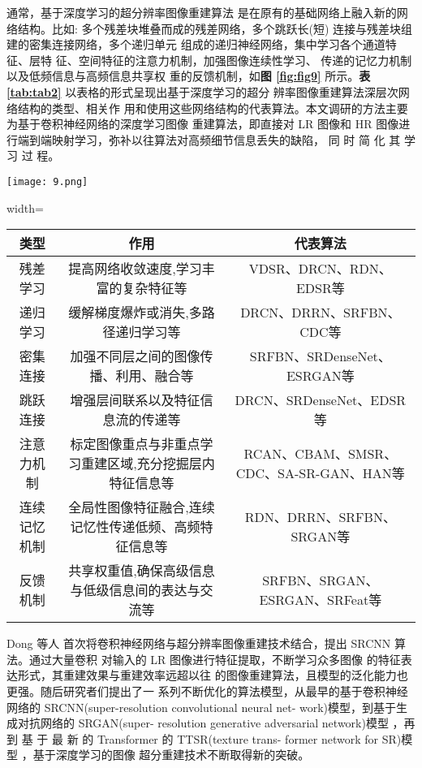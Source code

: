 通常，基于深度学习的超分辨率图像重建算法 是在原有的基础网络上融入新的网络结构。比如: 多个残差块堆叠而成的残差网络，多个跳跃长(短) 连接与残差块组建的密集连接网络，多个递归单元 组成的递归神经网络，集中学习各个通道特征、层特 征、空间特征的注意力机制，加强图像连续性学习、 传递的记忆力机制以及低频信息与高频信息共享权 重的反馈机制，如\textbf{图 \ref{fig:fig9}} 所示。\textbf{表 \ref{tab:tab2}} 以表格的形式呈现出基于深度学习的超分 辨率图像重建算法深层次网络结构的类型、相关作 用和使用这些网络结构的代表算法。本文调研的方法主要为基于卷积神经网络的深度学习图像 重建算法，即直接对 LR 图像和 HR 图像进行端到端映射学习，弥补以往算法对高频细节信息丢失的缺陷， 同 时 简 化 其 学 习 过 程。

\begin{figure*}[!h]
	\centering
	\texttt{[image: 9.png]}
	\caption{深度学习背景下的图像重建网络结构基本图}
	\label{fig:fig9}
\end{figure*}

\begin{table*}[!ht]
\centering
\caption{深度学习背景下的部分网络结构}
\begin{adjustbox}{width=\linewidth}
\begin{tabular}{ccc}
\toprule
	类型 &  作用 &  代表算法 \\ \hline
	 残差学习 &  提高网络收敛速度,学习丰富的复杂特征等 &  VDSR、DRCN、RDN、EDSR等 \\ \hline
	 递归学习 &  缓解梯度爆炸或消失,多路径递归学习等 &  DRCN、DRRN、SRFBN、CDC等 \\ \hline
	 密集连接 &  加强不同层之间的图像传播、利用、融合等 &  SRFBN、SRDenseNet、ESRGAN等 \\ \hline
	 跳跃连接 &  增强层间联系以及特征信息流的传递等 &  DRCN、SRDenseNet、EDSR等 \\ \hline
	 注意力机制 &  标定图像重点与非重点学习重建区域,充分挖掘层内特征信息等 &  RCAN、CBAM、SMSR、CDC、SA-SR-GAN、HAN等 \\ \hline
	 连续记忆机制 &  全局性图像特征融合,连续记忆性传递低频、高频特征信息等 &  RDN、DRRN、SRFBN、SRGAN等 \\ \hline
	 反馈机制 &  共享权重值,确保高级信息与低级信息间的表达与交流等 &  SRFBN、SRGAN、ESRGAN、SRFeat等 \\ \bottomrule
\end{tabular}
\end{adjustbox}
\label{tab:tab2}
\end{table*}

Dong 等人 \cite{DBLP:conf/iccvw/YoonJYLK15}首次将卷积神经网络与超分辨率图像重建技术结合，提出 SRCNN 算法。通过大量卷积 对输入的 LR 图像进行特征提取，不断学习众多图像 的特征表达形式，其重建效果与重建效率远超以往 的图像重建算法，且模型的泛化能力也更强。随后研究者们提出了一 系列不断优化的算法模型，从最早的基于卷积神经网络的 SRCNN(super-resolution convolutional neural net- work)模型，到基于生成对抗网络的 SRGAN(super- resolution generative adversarial network)模型 \cite{DBLP:conf/cvpr/LedigTHCCAATTWS17}，再到 基 于 最 新 的 Transformer 的 TTSR(texture trans- former network for SR)模型 \cite{DBLP:conf/cvpr/YangYFLG20}，基于深度学习的图像 超分重建技术不断取得新的突破。

